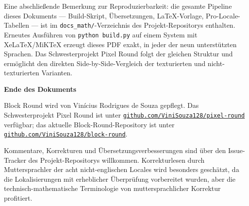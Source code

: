 \documentclass[12pt,a4paper]{scrartcl}
\newcommand{\code}[1]{\texttt{\small #1}}
\newcommand{\biblink}[2]{\href{#1}{\nolinkurl{#2}}}
\begin{document}
Eine abschließende Bemerkung zur Reproduzierbarkeit: die gesamte Pipeline dieses Dokuments --- Build-Skript, Übersetzungen, LaTeX-Vorlage, Pro-Locale-Tabellen --- ist im \code{docs\_math/}-Verzeichnis des Projekt-Repositorys enthalten. Erneutes Ausführen von \code{python build.py} auf einem System mit XeLaTeX/MiKTeX erzeugt dieses PDF exakt, in jeder der neun unterstützten Sprachen. Das Schwesterprojekt Pixel Round folgt der gleichen Struktur und ermöglicht den direkten Side-by-Side-Vergleich der texturierten und nicht-texturierten Varianten.

\vspace{1.2em}

\begin{center}
{\sffamily\bfseries\color{accent}Ende des Dokuments}
\end{center}

\vspace{0.6em}

Block Round wird von Vinícius Rodrigues de Souza gepflegt. Das Schwesterprojekt Pixel Round ist unter \biblink{https://github.com/ViniSouza128/pixel-round}{github.com/ViniSouza128/pixel-round} verfügbar; das aktuelle Block-Round-Repository ist unter \biblink{https://github.com/ViniSouza128/block-round}{github.com/ViniSouza128/block-round}.

Kommentare, Korrekturen und Übersetzungsverbesserungen sind über den Issue-Tracker des Projekt-Repositorys willkommen. Korrekturlesen durch Muttersprachler der acht nicht-englischen Locales wird besonders geschätzt, da die Lokalisierungen mit erheblicher Überprüfung vorbereitet wurden, aber die technisch-mathematische Terminologie von muttersprachlicher Korrektur profitiert.
\end{document}
